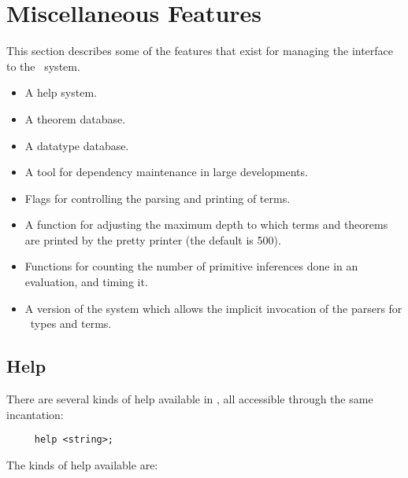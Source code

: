 \chapter{Miscellaneous Features}\label{avramisc}

This section describes some of the features
that exist for managing the interface to the \HOL\ system.

\begin{itemize}
\item A help system.
\item A theorem database.
\item A datatype database.
\item A tool for dependency maintenance in large developments.
\item Flags for controlling the parsing and printing of terms.
\item A function for adjusting the maximum depth to which terms and
theorems are printed by the pretty printer (the default is 500).
\item Functions for counting the number of primitive inferences done in
an evaluation, and timing it.
\item A version of the system which allows the implicit invocation of
the parsers for \HOL\ types and terms.
\end{itemize}

\section{Help}

 There are several kinds of help available in \holn{}, all accessible
 through the same incantation:
 \begin{verbatim}
     help <string>;
 \end{verbatim}

 The kinds of help available are:

